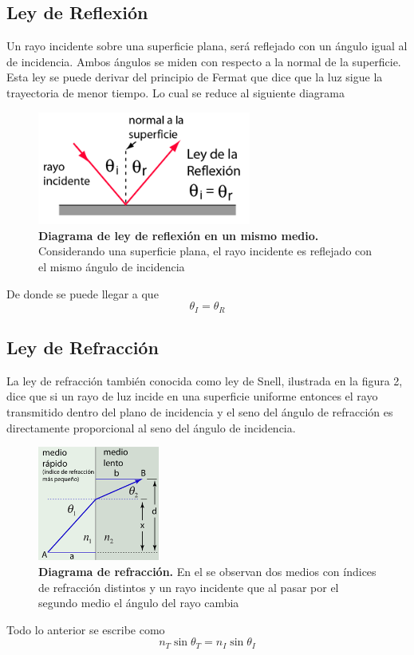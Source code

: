 \documentclass[DIV=calc, paper=a4, fontsize=11pt]{scrartcl}
\begin{document}
\subsection*{\textcolor{carmine}{Ley de Reflexión}}
Un rayo incidente sobre una superficie plana, será reflejado con un ángulo igual al de incidencia. Ambos ángulos se miden con respecto a la normal de la superficie. Esta ley se puede derivar del principio de 
Fermat que dice que la luz sigue la trayectoria de menor tiempo. Lo cual se reduce al siguiente diagrama 
\begin{figure}[H]
    \centering
    \includegraphics[width=7cm]{imagenes/reflaw.png}
    \caption{\textbf{Diagrama de ley de reflexión en un mismo medio.} Considerando una superficie plana, el rayo incidente es reflejado con el mismo ángulo de incidencia\cite{pagina}}
    \label{fig:my_label}
\end{figure}
De donde se puede llegar a que\cite{Manual}
\begin{equation}
    \theta_{I} = \theta_{R}
\end{equation}
\subsection*{\textcolor{carmine}{Ley de Refracción}}
La ley de refracción también conocida como ley de Snell, ilustrada en la figura 2, dice que si un rayo de luz incide en una superficie uniforme entonces el rayo transmitido dentro del plano de incidencia y el seno del ángulo de refracción es directamente proporcional al seno del ángulo de incidencia\cite{book}. 
\begin{figure}[H]
    \centering
    \includegraphics[width=4cm]{imagenes/fer5.png}
    \caption{\textbf{Diagrama de refracción.} En el se observan dos medios con índices de refracción distintos y un rayo incidente que al pasar por el segundo medio el ángulo del rayo cambia \cite{pagina}}
    \label{fig:my_label}
\end{figure}
Todo lo anterior se escribe como \cite{book} 
\begin{equation*}
    n_T \sin{\theta_T} =  n_I \sin{\theta_I} 
\end{equation*}
\end{document}
